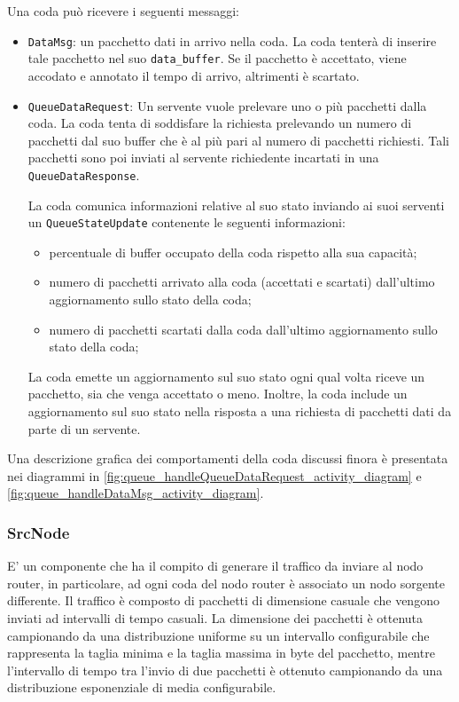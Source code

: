 \documentclass[conference]{IEEEtran}
\newcommand{\code}[1]{\texttt{#1}}
\begin{document}
Una coda può ricevere i seguenti messaggi:
\begin{itemize}
    \item \code{DataMsg}: un pacchetto dati in arrivo nella coda. La coda tenterà di
    inserire tale pacchetto nel suo \code{data\_buffer}. Se il pacchetto è accettato,
    viene accodato e annotato il tempo di arrivo, altrimenti è scartato.
    \item \code{QueueDataRequest}: Un servente vuole prelevare uno o più pacchetti
     dalla coda. La coda tenta di soddisfare la richiesta prelevando un numero di
     pacchetti dal suo buffer che è al più pari al numero di pacchetti richiesti.
     Tali pacchetti sono poi inviati al servente richiedente incartati in una
     \code{QueueDataResponse}.

La coda comunica informazioni relative al suo stato inviando ai suoi serventi un
\code{QueueStateUpdate} contenente le seguenti informazioni:
\begin{itemize}
    \item percentuale di buffer occupato della coda rispetto alla sua capacità;
    \item numero di pacchetti arrivato alla coda (accettati e scartati) dall'ultimo
    aggiornamento sullo stato della coda;
    \item numero di pacchetti scartati dalla coda dall'ultimo aggiornamento sullo stato
    della coda;
\end{itemize}
La coda emette un aggiornamento sul suo stato ogni qual volta riceve un pacchetto, sia
che venga accettato o meno. Inoltre, la coda include un aggiornamento sul suo stato
nella risposta a una richiesta di pacchetti dati da parte di un servente.    
\end{itemize}

Una descrizione grafica dei comportamenti della coda discussi finora è presentata
nei diagrammi in \autoref{fig:queue_handleQueueDataRequest_activity_diagram} e 
\autoref{fig:queue_handleDataMsg_activity_diagram}.

\subsubsection{SrcNode}
E' un componente che ha il compito di generare il traffico da inviare al nodo router, in particolare, ad ogni coda del nodo router è associato un nodo sorgente differente. Il traffico è composto di pacchetti di dimensione casuale che vengono inviati ad intervalli di tempo casuali. La dimensione dei pacchetti è ottenuta campionando da una distribuzione uniforme su un intervallo configurabile che rappresenta la taglia minima e la taglia massima in byte del pacchetto, mentre l'intervallo di tempo tra l'invio di due pacchetti è ottenuto campionando da una distribuzione esponenziale di media configurabile.
\end{document}
